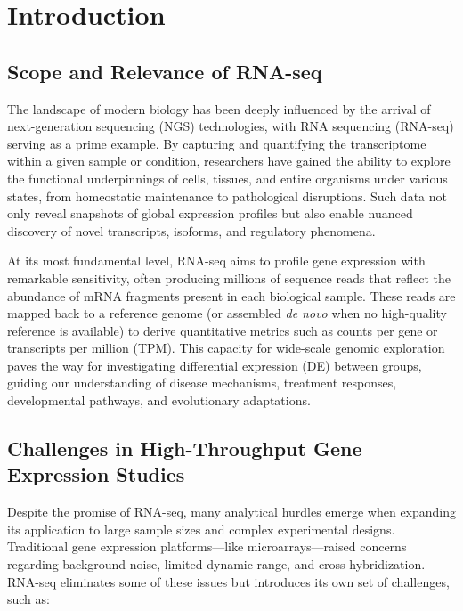 \documentclass[12pt]{article}
\begin{document}
\tableofcontents

\section{Introduction}
\label{sec:introduction}

\subsection{Scope and Relevance of RNA-seq}
The landscape of modern biology has been deeply influenced by the arrival of next-generation sequencing (NGS) technologies, with RNA sequencing (RNA-seq) serving as a prime example. By capturing and quantifying the transcriptome within a given sample or condition, researchers have gained the ability to explore the functional underpinnings of cells, tissues, and entire organisms under various states, from homeostatic maintenance to pathological disruptions. Such data not only reveal snapshots of global expression profiles but also enable nuanced discovery of novel transcripts, isoforms, and regulatory phenomena.

At its most fundamental level, RNA-seq aims to profile gene expression with remarkable sensitivity, often producing millions of sequence reads that reflect the abundance of mRNA fragments present in each biological sample. These reads are mapped back to a reference genome (or assembled \emph{de novo} when no high-quality reference is available) to derive quantitative metrics such as counts per gene or transcripts per million (TPM). This capacity for wide-scale genomic exploration paves the way for investigating differential expression (DE) between groups, guiding our understanding of disease mechanisms, treatment responses, developmental pathways, and evolutionary adaptations.

\subsection{Challenges in High-Throughput Gene Expression Studies}
Despite the promise of RNA-seq, many analytical hurdles emerge when expanding its application to large sample sizes and complex experimental designs. Traditional gene expression platforms—like microarrays—raised \cite{ritchie2015limma} concerns regarding background noise, limited dynamic range, and cross-hybridization. RNA-seq eliminates some of these issues but introduces its own set of challenges, such as:
\end{document}
